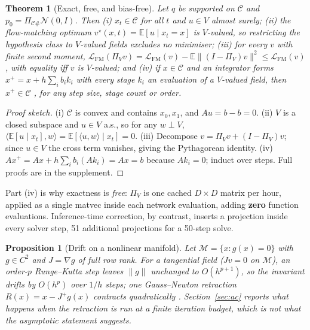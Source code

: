 \documentclass{article}
\newtheorem{theorem}{Theorem}
\newtheorem{proposition}{Proposition}
\begin{document}
\begin{theorem}[Exact, free, and bias-free]\label{thm:affine}
Let $q$ be supported on $\mathcal C$ and $p_0=\Pi_{\mathcal C\#}\mathcal N(0,I)$.
Then \emph{(i)} $x_t\in\mathcal C$ for all $t$ and $u\in V$ almost surely;
\emph{(ii)} the flow-matching optimum $v^\star(x,t)=\mathbb E[u\mid x_t=x]$ is
$V$-valued, so restricting the hypothesis class to $V$-valued fields excludes no
minimiser; \emph{(iii)} for every $v$ with finite second moment,
$\mathcal L_{\mathrm{FM}}(\Pi_V v)=\mathcal L_{\mathrm{FM}}(v)-\mathbb E\|(I-\Pi_V)v\|^2
\le\mathcal L_{\mathrm{FM}}(v)$, with equality iff $v$ is $V$-valued; and
\emph{(iv)} if $x\in\mathcal C$ and an integrator forms $x^{+}=x+h\sum_i b_ik_i$ with
every stage $k_i$ an evaluation of a $V$-valued field, then $x^{+}\in\mathcal C$ , 
for any step size, stage count or order.
\end{theorem}

\begin{proof}[Proof sketch]
(i) $\mathcal C$ is convex and contains $x_0,x_1$, and $Au=b-b=0$.
(ii) $V$ is a closed subspace and $u\in V$ a.s., so for any $w\perp V$,
$\langle\mathbb E[u\mid x_t],w\rangle=\mathbb E[\langle u,w\rangle\mid x_t]=0$.
(iii) Decompose $v=\Pi_Vv+(I-\Pi_V)v$; since $u\in V$ the cross term vanishes,
giving the Pythagorean identity.
(iv) $Ax^{+}=Ax+h\sum_ib_i(Ak_i)=Ax=b$ because $Ak_i=0$; induct over steps.
Full proofs are in the supplement.
\end{proof}

Part (iv) is why exactness is \emph{free}: $\Pi_V$ is one cached $D\times D$
matrix per hour, applied as a single matvec inside each network evaluation, adding
\textbf{zero} function evaluations. Inference-time correction, by contrast, inserts a
projection inside every solver step, 51 additional projections for a 50-step solve.

\begin{proposition}[Drift on a nonlinear manifold]\label{prop:manifold}
Let $\mathcal M=\{x:g(x)=0\}$ with $g\in C^2$ and $J=\nabla g$ of full row rank. For a
tangential field ($Jv=0$ on $\mathcal M$), an order-$p$ Runge--Kutta step leaves
$\|g\|$ unchanged to $O(h^{p+1})$, so the invariant drifts by $O(h^{p})$ over $1/h$
steps; one Gauss--Newton retraction $R(x)=x-J^{+}g(x)$ contracts quadratically
\citep{hairer2006geometric}. Section~\ref{sec:ac} reports what happens when the
retraction is run at a finite iteration budget, which is not what the asymptotic
statement suggests.
\end{proposition}
\end{document}
